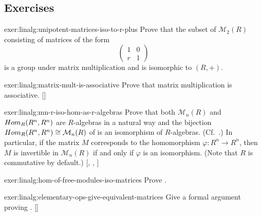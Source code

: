 \subsection*{Exercises}

\begin{exer}{}{exer:linalg:unipotent-matrices-iso-to-r-plus}
  Prove that the subset of $\mathcal{M}_2(R)$ consisting of matrices
  of the form
  \[
    \begin{pmatrix} 1 & 0 \\ r & 1 \end{pmatrix}
  \]
  is a group under matrix multiplication and is isomorphic to $(R,+)$.
\end{exer}
\begin{exer}{\exerused}{exer:linalg:matrix-mult-is-associative}
  Prove that matrix multiplication is
  associative. []
\end{exer}
\begin{exer}{\exerused}{exer:linalg:mn-r-iso-hom-as-r-algebras}
  Prove that both $\mathcal{M}_n(R)$ and $Hom_R(R^n, R^n)$ are
  $R$-algebras in a natural way and the bijection
  $Hom_R(R^n, R^n) \cong \mathcal{M}_n(R)$ of  is an
  isomorphism of $R$-algebras. (Cf.\
  .) In particular, if the
  matrix $M$ corresponds to the homomorphism $\varphi : R^n \to R^n$,
  then $M$ is invertible in $\mathcal{M}_n(R)$ if and only if
  $\varphi$ is an isomorphism. (Note that $R$ is commutative by
  default.) [,
  ,
  ]
\end{exer}
\begin{exer}{}{exer:linalg:hom-of-free-modules-iso-matrices}
  Prove .
\end{exer}
\begin{exer}{\exerused}{exer:linalg:elementary-ops-give-equivalent-matrices}
  Give a formal argument proving
  . []
\end{exer}

